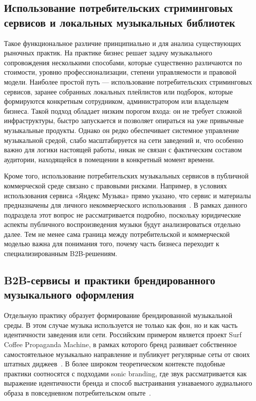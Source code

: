 \subsection{Использование потребительских стриминговых сервисов и локальных музыкальных библиотек}

Такое функциональное различие принципиально и для анализа существующих рыночных практик. На практике бизнес решает задачу музыкального сопровождения несколькими способами, которые существенно различаются по стоимости, уровню профессионализации, степени управляемости и правовой модели. Наиболее простой путь — использование потребительских стриминговых сервисов, заранее собранных локальных плейлистов или подборок, которые формируются конкретным сотрудником, администратором или владельцем бизнеса. Такой подход обладает низким порогом входа: он не требует сложной инфраструктуры, быстро запускается и позволяет опираться на уже привычные музыкальные продукты. Однако он редко обеспечивает системное управление музыкальной средой, слабо масштабируется на сети заведений и, что особенно важно для логики настоящей работы, никак не связан с фактическим составом аудитории, находящейся в помещении в конкретный момент времени.

Кроме того, использование потребительских музыкальных сервисов в публичной коммерческой среде связано с правовыми рисками. Например, в условиях использования сервиса «Яндекс Музыка» прямо указано, что сервис и материалы предназначены для личного некоммерческого использования~\cite{yandex_music_terms}. В рамках данного подраздела этот вопрос не рассматривается подробно, поскольку юридические аспекты публичного воспроизведения музыки будут анализироваться отдельно далее. Тем не менее сама граница между потребительской и коммерческой моделью важна для понимания того, почему часть бизнеса переходит к специализированным B2B-решениям.

\subsection{B2B-сервисы и практики брендированного музыкального оформления}

Отдельную практику образует формирование брендированной музыкальной среды. В этом случае музыка используется не только как фон, но и как часть идентичности заведения или сети. Российским примером является проект Surf Coffee Propaganda Machine, в рамках которого бренд развивает собственное самостоятельное музыкально направление и публикует регулярные сеты от своих штатных диджеев~\cite{surf_soundcloud}. В более широком теоретическом контексте подобные практики соотносятся с подходами sonic branding, где звук рассматривается как выражение идентичности бренда и способ выстраивания узнаваемого аудиального образа в повседневном потребительском опыте~\cite{khamis2021sonic}.

